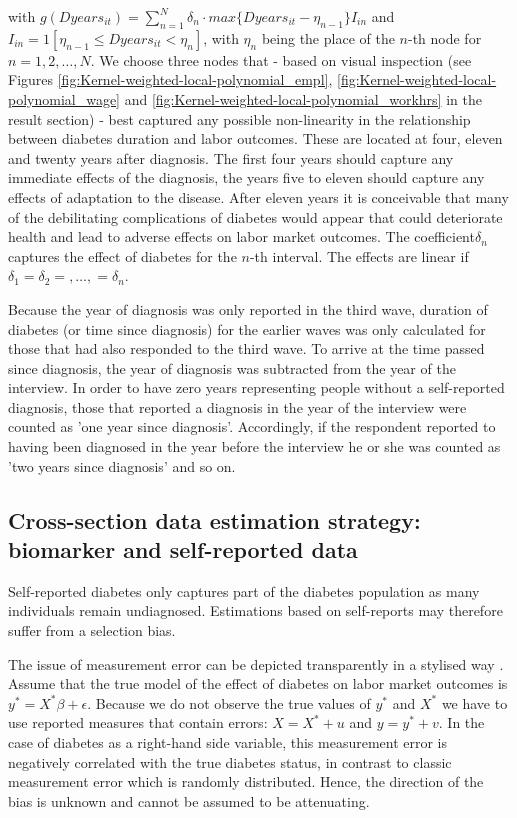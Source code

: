 \documentclass[12pt,english,british]{article}
\begin{document}
\noindent with $g(Dyears_{it})=\sum_{n=1}^{N}\delta_{n}\cdot max\{Dyears_{it}-\eta_{n-1}\}I_{in}$
and $I_{in}=1[\eta_{n-1}\leq Dyears_{it}<\eta_{n}]$, with $\eta_{n}$
being the place of the $n$-th node for $n=1,2,\ldots,N$. We choose
three nodes that - based on visual inspection (see Figures \ref{fig:Kernel-weighted-local-polynomial_empl}, \ref{fig:Kernel-weighted-local-polynomial_wage} and \ref{fig:Kernel-weighted-local-polynomial_workhrs} in the
result section) - best captured any possible non-linearity in the
relationship between diabetes duration and labor outcomes. These
are located at four, eleven and twenty years after diagnosis. The
first four years should capture any immediate effects of the diagnosis,
the years five to eleven should capture any effects of adaptation to
the disease. After eleven years it is conceivable that many of the
debilitating complications of diabetes would appear that could deteriorate
health and lead to adverse effects on labor market outcomes.
The coefficient$\delta_{n}$ captures the effect of diabetes for the
$n$-th interval. The effects are linear if $\delta_{1}=\delta_{2}=,\ldots,=\delta_{n}$.

Because the year of diagnosis was only reported in the third wave,
duration of diabetes (or time since diagnosis)
for the earlier waves was only calculated for those that had also responded to the third
wave. To arrive at the time passed since diagnosis, the year of diagnosis
was subtracted from the year of the interview. In order to have zero years representing people without a self-reported  diagnosis, those that reported
a diagnosis in the year of the interview were counted as 'one year
since diagnosis'. Accordingly, if the respondent reported to having
been diagnosed in the year before the interview he or she was counted
as 'two years since diagnosis' and so on.

\subsection{Cross-section data estimation strategy: biomarker and self-reported data}

Self-reported diabetes only captures part of the diabetes population as many individuals remain undiagnosed.  Estimations based on self-reports may therefore suffer from a selection bias.

The issue of measurement error can be depicted transparently in a stylised way . Assume that the true model of the effect of diabetes on labor market outcomes is $y^{*}=X^{*}\beta+\epsilon$. Because we do not observe the true values of $y^{*}$ and $X^{*}$  we have to use reported measures that contain errors: $X=X^{*} + u$ and $y=y^{*} + v$. In the case of diabetes as a right-hand side variable, this measurement error is negatively correlated with the true diabetes status, in contrast to classic measurement error which is randomly distributed. Hence, the direction of the bias is unknown and cannot be assumed to be attenuating.
\end{document}
